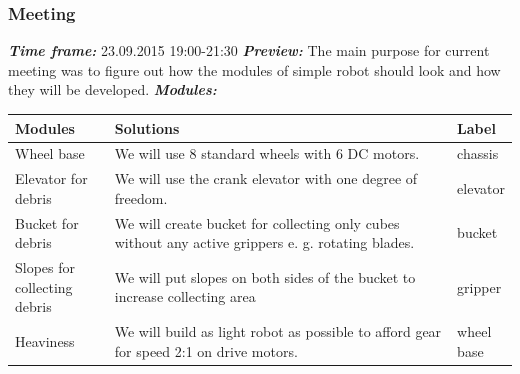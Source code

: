 \addtocounter{number_of_meeting}{1}
\subsubsection{ Meeting}
	\textit{\textbf{Time frame:}} 23.09.2015 19:00-21:30 \newline
	\textit{\textbf{Preview:}} The main purpose for current meeting was to figure out how the modules of simple robot should look and how they will be developed. \newline \newline
	\textit{\textbf{Modules:}}

  \begin{table}[H]
	\vspace{-2mm}
	\begin{center}
		\begin{tabular}{|p{0.2\linewidth}|p{0.7\linewidth}|p{0.1\linewidth}|}
			\hline
			Modules & Solutions & Label \\
			\hline
			Wheel base & We will use 8 standard wheels with 6 DC motors. & chassis \\
			\hline
			Elevator for debris & We will use the crank elevator with one degree of freedom. & elevator \\
			\hline
			Bucket for debris & We will create bucket for collecting only cubes without any active grippers e. g. rotating blades. & bucket \\
			\hline
			Slopes for collecting debris & We will put slopes on both sides of the bucket to increase collecting area & gripper \\
			\hline
			Heaviness & We will build as light robot as possible to afford gear for speed 2:1 on drive motors. & wheel base \\
			\hline
		\end{tabular}
	\end{center}
  \end{table}
  
